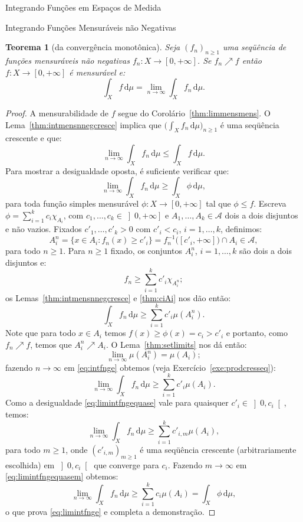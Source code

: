 \documentclass[oneside,final,11pt]{amsbook}
\newcommand{\dd}{\mathrm d}
\theoremstyle{remark}\newtheorem{exercise}{Exercício}[chapter]
\theoremstyle{remark}\newtheorem{*exercise}[exercise]{\hbox to 0pt{\hskip 0pt minus 1fil*}Exercício}
\theoremstyle{definition}\newtheorem{exdefin}{Definição}[chapter]
\theoremstyle{plain}\newtheorem{teo}{Teorema}[section]
\theoremstyle{plain}\newtheorem{lem}[teo]{Lema}
\theoremstyle{plain}\newtheorem{prop}[teo]{Proposição}
\theoremstyle{plain}\newtheorem{cor}[teo]{Corolário}
\theoremstyle{definition}\newtheorem{defin}[teo]{Definição}
\theoremstyle{remark}\newtheorem{rem}[teo]{Observação}
\theoremstyle{definition}\newtheorem{notation}[teo]{Notação}
\theoremstyle{definition}\newtheorem{convention}[teo]{Convenção}
\theoremstyle{definition}\newtheorem{example}[teo]{Exemplo}
\numberwithin{section}{chapter}
\numberwithin{equation}{section}
\begin{document}
\begin{chapter}{Integrando Funções em Espaços de Medida}
\begin{section}{Integrando Funções Mensuráveis não Negativas}
\begin{teo}[da convergência monotônica]\label{thm:monotonicanneg}
%
Seja $(f_n)_{n\ge1}$ uma se\-qüên\-cia de funções mensuráveis não negativas $f_n:X\to[0,+\infty]$.
Se $f_n\nearrow f$ então $f:X\to[0,+\infty]$ é mensurável e:
\[\int_Xf\,\dd\mu=\lim_{n\to\infty}\int_Xf_n\,\dd\mu.\]
\end{teo}
\begin{proof}
A mensurabilidade de $f$ segue do Corolário~\ref{thm:limmensmens}. O Lema~\ref{thm:intmensnnegcresce}
implica que $\big(\int_Xf_n\,\dd\mu\big)_{n\ge1}$ é uma seqüência crescente e que:
\[\lim_{n\to\infty}\int_Xf_n\,\dd\mu\le\int_Xf\,\dd\mu.\]
Para mostrar a desigualdade oposta, é suficiente verificar que:
\begin{equation}\label{eq:limintfnge}
\lim_{n\to\infty}\int_Xf_n\,\dd\mu\ge\int_X\phi\,\dd\mu,
\end{equation}
para toda função simples mensurável $\phi:X\to[0,+\infty]$ tal que $\phi\le f$.
Escreva $\phi=\sum_{i=1}^kc_i\chi_{A_i}$, com $c_1,\ldots,c_k\in\left]0,+\infty\right]$
e $A_1,\ldots,A_k\in\mathcal A$ dois a dois disjuntos e não vazios. Fixados $c'_1,\ldots,c'_k>0$
com $c'_i<c_i$, $i=1,\ldots,k$, definimos:
\[A_i^n=\big\{x\in A_i:f_n(x)\ge c'_i\big\}=f_n^{-1}\big([c'_i,+\infty]\big)\cap A_i\in\mathcal A,\]
para todo $n\ge1$. Para $n\ge1$ fixado, os conjuntos $A_i^n$, $i=1,\ldots,k$ são dois a dois
disjuntos e:
\[f_n\ge\sum_{i=1}^kc'_i\chi_{A_i^n};\]
os Lemas~\ref{thm:intmensnnegcresce} e \ref{thm:ciAi} nos dão então:
\begin{equation}\label{eq:intfnge}
\int_Xf_n\,\dd\mu\ge\sum_{i=1}^kc'_i\mu(A_i^n).
\end{equation}
Note que para todo $x\in A_i$ temos $f(x)\ge\phi(x)=c_i>c'_i$ e portanto,
como $f_n\nearrow f$, temos que $A_i^n\nearrow A_i$. O Lema~\ref{thm:setlimits}
nos dá então:
\[\lim_{n\to\infty}\mu(A_i^n)=\mu(A_i);\]
fazendo $n\to\infty$ em \eqref{eq:intfnge} obtemos (veja Exercício~\ref{exe:prodcresseq}):
\begin{equation}\label{eq:limintfngequase}
\lim_{n\to\infty}\int_Xf_n\,\dd\mu\ge\sum_{i=1}^kc'_i\mu(A_i).
\end{equation}
Como a desigualdade \eqref{eq:limintfngequase} vale para quaisquer $c'_i\in\left]0,c_i\right[$,
temos:
\begin{equation}\label{eq:limintfngequasem}
\lim_{n\to\infty}\int_Xf_n\,\dd\mu\ge\sum_{i=1}^kc'_{i,m}\mu(A_i),
\end{equation}
para todo $m\ge1$, onde $(c'_{i,m})_{m\ge1}$ é uma seqüência crescente (arbitrariamente escolhida) em $\left]0,c_i\right[$
que converge para $c_i$. Fazendo $m\to\infty$ em \eqref{eq:limintfngequasem} obtemos:
\[\lim_{n\to\infty}\int_Xf_n\,\dd\mu\ge\sum_{i=1}^kc_i\mu(A_i)=\int_X\phi\,\dd\mu,\]
o que prova \eqref{eq:limintfnge} e completa a demonstração.
\end{proof}


\end{section}
\end{chapter}
\end{document}
